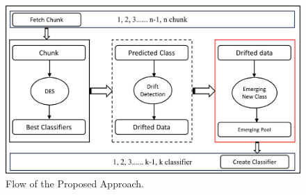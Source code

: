 \begin{figure}[ht]
	\centering
	\includegraphics[width=1\linewidth]{5_Emerging/images/pro1.png}
	\caption{Flow of the Proposed Approach.}
	\label{fig:proposal_step_1}
\end{figure}

